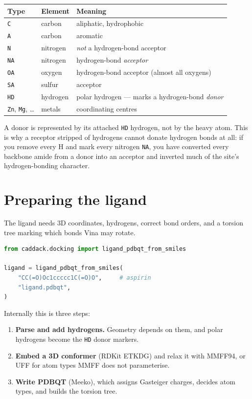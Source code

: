\documentclass[11pt,a4paper]{article}
\newcommand{\code}[1]{\texttt{#1}}
\begin{document}
\begin{center}
\renewcommand{\arraystretch}{1.2}
\begin{tabular}{@{}llp{7.6cm}@{}}
\toprule
\textbf{Type} & \textbf{Element} & \textbf{Meaning} \\
\midrule
\code{C}  & carbon   & aliphatic, hydrophobic \\
\code{A}  & carbon   & aromatic \\
\code{N}  & nitrogen & \emph{not} a hydrogen-bond acceptor \\
\code{NA} & nitrogen & hydrogen-bond \emph{acceptor} \\
\code{OA} & oxygen   & hydrogen-bond acceptor (almost all oxygens) \\
\code{SA} & sulfur   & acceptor \\
\code{HD} & hydrogen & polar hydrogen --- marks a hydrogen-bond \emph{donor} \\
\code{Zn}, \code{Mg}, \dots & metals & coordinating centres \\
\bottomrule
\end{tabular}
\end{center}

A donor is represented by its attached \code{HD} hydrogen, not by the heavy atom.
This is why a receptor stripped of hydrogens cannot donate hydrogen bonds at all:
if you remove every H and mark every nitrogen \code{NA}, you have converted every
backbone amide from a donor into an acceptor and inverted much of the site's
hydrogen-bonding character.

\section{Preparing the ligand}

The ligand needs 3D coordinates, hydrogens, correct bond orders, and a torsion
tree marking which bonds Vina may rotate.

\begin{lstlisting}[language=Python]
from caddack.docking import ligand_pdbqt_from_smiles

ligand = ligand_pdbqt_from_smiles(
    "CC(=O)Oc1ccccc1C(=O)O",     # aspirin
    "ligand.pdbqt",
)
\end{lstlisting}

Internally this is three steps:

\begin{enumerate}[leftmargin=1.3em, itemsep=2pt]
  \item \textbf{Parse and add hydrogens.} Geometry depends on them, and polar
        hydrogens become the \code{HD} donor markers.
  \item \textbf{Embed a 3D conformer} (RDKit ETKDG) and relax it with MMFF94, or
        UFF for atom types MMFF does not parameterise.
  \item \textbf{Write PDBQT} (Meeko), which assigns Gasteiger charges, decides atom
        types, and builds the torsion tree.
\end{enumerate}
\end{document}
